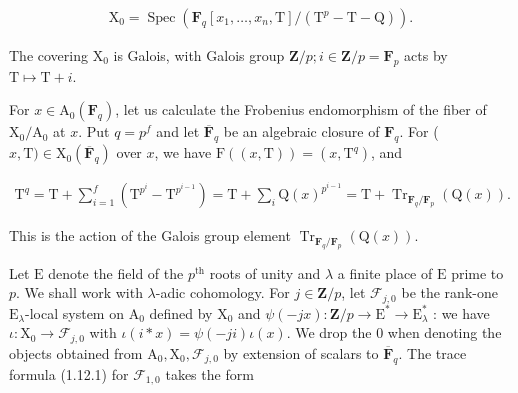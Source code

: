 \documentclass[10pt,leqno]{article}
\begin{document}
\begin{equation*}\begin{gathered}\mathrm{X}_{0} = \operatorname{Spec}(\mathbf{F}_{q}[x_{1},\ldots ,x_{n},\mathrm{T}]/(\mathrm{T}^{p}-\mathrm{T}-\mathrm{Q})).\end{gathered}\end{equation*}

\noindent The covering \(\mathrm{X}_{0}\) is Galois, with Galois group \(\mathbf{Z}/p; i \in  \mathbf{Z}/p = \mathbf{F}_{p}\) acts by \(\mathrm{T} \longmapsto  \mathrm{T}+i\).\par

\noindent For \(x \in  \mathrm{A}_{0}(\mathbf{F}_{q})\), let us calculate the Frobenius endomorphism of the fiber of \(\mathrm{X}_{0}/\mathrm{A}_{0}\) at \(x\). Put \(q = p^{f}\) and let \(\overline{\mathbf{F}}_{q}\) be an algebraic closure of \(\mathbf{F}_{q}\). For (\(x,\mathrm{T}) \in  \mathrm{X}_{0}(\overline{\mathbf{F}}_{q})\) over \(x\), we have \(\mathrm{F}((x,\mathrm{T})) = (x,\mathrm{T}^{q})\), and\par

\begin{equation*}\begin{gathered}\mathrm{T}^{q} = \mathrm{T} + \sum _{i=1}^{f} (\mathrm{T}^{p^{i}}-\mathrm{T}^{p^{i-1}}) = \mathrm{T} + \sum _{i} \mathrm{Q}(x)^{p^{i-1}} = \mathrm{T} + \operatorname{Tr}_{\mathbf{F}_{q}/\mathbf{F}_{p}}(\mathrm{Q}(x)).\end{gathered}\end{equation*}

\noindent This is the action of the Galois group element \(\operatorname{Tr}_{\mathbf{F}_{q}/\mathbf{F}_{p}}(\mathrm{Q}(x))\).\par

\noindent Let \(\mathrm{E}\) denote the field of the \(p^{\mathrm{th}}\) roots of unity and \(\lambda \) a finite place of \(\mathrm{E}\) prime to \(p\). We shall work with \(\lambda \)-adic cohomology. For \(j \in  \mathbf{Z}/p\), let \(\mathcal{F} _{j,0}\) be the rank-one \(\mathrm{E}_{\lambda }\)-local system on \(\mathrm{A}_{0}\) defined by \(\mathrm{X}_{0}\) and \(\psi (-jx) : \mathbf{Z}/p \longrightarrow  \mathrm{E}^{*} \longrightarrow  \mathrm{E}_{\lambda }^{*}\) : we have \(\iota  : \mathrm{X}_{0} \longrightarrow  \mathcal{F} _{j,0}\) with \(\iota (i*x) = \psi (-ji)\iota (x)\). We drop the 0 when denoting the objects obtained from \(\mathrm{A}_{0}, \mathrm{X}_{0}, \mathcal{F} _{j,0}\) by extension of scalars to \(\overline{\mathbf{F}}_{q}\). The trace formula (1.12.1) for \(\mathcal{F} _{1,0}\) takes the form\par
\end{document}
